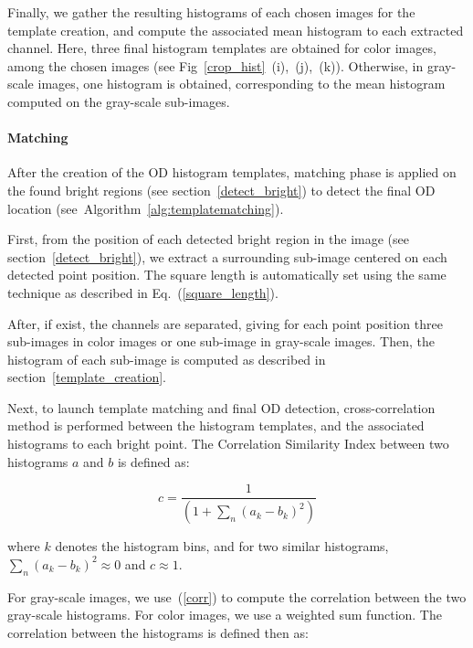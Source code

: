 Finally, we gather the resulting histograms of each chosen images for the template creation, and compute the associated mean histogram to each extracted channel. Here, three final histogram templates are obtained for color images, among the chosen images (see \mbox{Fig \ref{crop_hist} (i), (j), (k)}). Otherwise, in gray-scale images, one histogram is obtained, corresponding to the mean histogram computed on the gray-scale sub-images.

\paragraph{\label{matching}Matching}



After the creation of the OD histogram templates, matching phase is applied on the found bright regions (see \mbox{section \ref{detect_bright}}) to detect the final OD location \mbox{(see Algorithm~\ref{alg:templatematching})}.

First, from the position of each detected bright region in the image (see \mbox{section \ref{detect_bright}}), we extract a surrounding sub-image centered on each detected point position. The square length is automatically set using the same technique as described in \mbox{Eq. (\ref{square_length})}. 

After, if exist, the channels are separated, giving for each point position three sub-images in color images or one sub-image in gray-scale images. Then, the histogram of each sub-image is computed as described in \mbox{section \ref{template_creation}}.

Next, to launch template matching and final OD detection, cross-correlation method is performed between the histogram templates, and the associated histograms to each bright point. The Correlation Similarity Index between two histograms $a$ and $b$ is defined as:

\begin{equation}
c = \frac{1}{(1 + \sum_{n}(a_k - b_k)^2)}
\label{corr}
\end{equation}

\noindent where $k$ denotes the histogram bins, and for two similar histograms, $\sum_{n}(a_k - b_k)^2 \approx 0$ and $c \approx 1$.

For gray-scale images, we \mbox{use (\ref{corr})} to compute the correlation between the two gray-scale histograms. For color images, we use a weighted sum function. The correlation between the histograms is defined then as:

